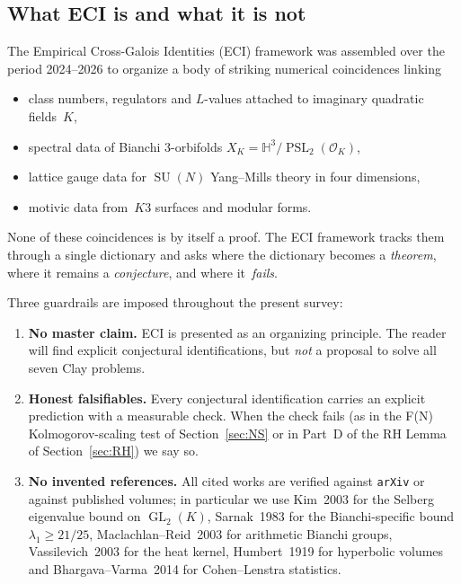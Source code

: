 \documentclass[11pt,a4paper]{article}
\theoremstyle{definition}
\DeclareMathOperator{\PSL}{PSL}
\DeclareMathOperator{\GL}{GL}
\DeclareMathOperator{\SU}{SU}
\newcommand{\OK}{\mathcal{O}_K}
\newcommand{\HH}{\mathbb{H}}
\begin{document}
\subsection{What ECI is and what it is not}
The Empirical Cross-Galois Identities (ECI) framework was assembled
over the period 2024--2026 to organize a body of striking numerical
coincidences linking
\begin{itemize}
  \item class numbers, regulators and $L$-values attached to imaginary quadratic fields~$K$,
  \item spectral data of Bianchi 3-orbifolds $X_{K} = \HH^{3}/\PSL_{2}(\OK)$,
  \item lattice gauge data for $\SU(N)$ Yang--Mills theory in four dimensions,
  \item motivic data from~$K3$ surfaces and modular forms.
\end{itemize}
None of these coincidences is by itself a proof. The ECI framework
tracks them through a single dictionary and asks where the dictionary
becomes a \emph{theorem}, where it remains a \emph{conjecture},
and where it~\emph{fails}.

Three guardrails are imposed throughout the present survey:
\begin{enumerate}[label=(G\arabic*),leftmargin=2em]
  \item \textbf{No master claim.} ECI is presented as an organizing
        principle. The reader will find explicit conjectural
        identifications, but \emph{not} a proposal to solve all
        seven Clay problems.
  \item \textbf{Honest falsifiables.} Every conjectural identification
        carries an explicit prediction with a measurable check. When
        the check fails (as in the F(N) Kolmogorov-scaling test of
        Section~\ref{sec:NS} or in Part~D of the RH Lemma of
        Section~\ref{sec:RH}) we say so.
  \item \textbf{No invented references.} All cited works are verified
        against \texttt{arXiv} or against published volumes; in
        particular we use Kim~2003 \cite{Kim2003} for the Selberg
        eigenvalue bound on $\GL_{2}(K)$, Sarnak~1983 \cite{Sarnak1983}
        for the Bianchi-specific bound $\lambda_{1}\geq 21/25$,
        Maclachlan--Reid~2003 \cite{MaclachlanReid2003} for arithmetic
        Bianchi groups, Vassilevich~2003 \cite{Vassilevich2003} for the
        heat kernel, Humbert~1919 \cite{Humbert1919} for hyperbolic
        volumes and Bhargava--Varma~2014 \cite{BhargavaVarma2014} for
        Cohen--Lenstra statistics.
\end{enumerate}
\end{document}
